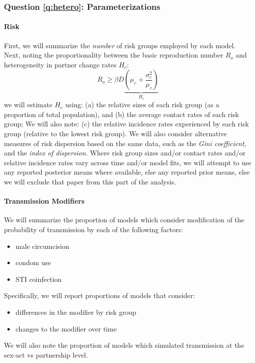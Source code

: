\documentclass{article}
\begin{document}
\subsubsection{Question \ref{q:hetero}: Parameterizations}
\paragraph{Risk}
First, we will summarize the \emph{number} of risk groups employed by each model.
Next, noting the proportionality between the basic reproduction number $R_o$
and heterogeneity in partner change rates $H_c$:
\begin{equation}
  R_o \ge \beta D \underbrace{\left(\mu_c + \frac{\sigma_c^2}{\mu_c}\right)}_{H_c}
\end{equation}
we will estimate $H_c$ using:
(a) the relative sizes of each risk group (as a proportion of total population), and
(b) the average contact rates of each risk group;
We will also note:
(c) the relative incidence rates experienced by each risk group
(relative to the lowest risk group).
We will also consider alternative measures of risk dispersion based on the same data, such as
the \emph{Gini coefficient}, and the \emph{index of dispersion}.
Where risk group sizes and/or contact rates and/or relative incidence rates
vary across time and/or model fits,
we will attempt to use any reported posterior means where available,
else any reported prior means,
else we will exclude that paper from this part of the analysis.
\paragraph{Transmission Modifiers}
We will summarize the proportion of models which consider modification of
the probability of transmission by each of the following factors:
\begin{itemize}[topsep=0pt]
  \item male circumcision
  \item condom use
  \item STI coinfection
\end{itemize}
Specifically, we will report proportions of models that consider:
\begin{itemize}[topsep=0pt]
  \item differences in the modifier by risk group
  \item changes to the modifier over time
\end{itemize}
We will also note the proportion of models which simulated transmission
at the sex-act vs partnership level.
\end{document}
